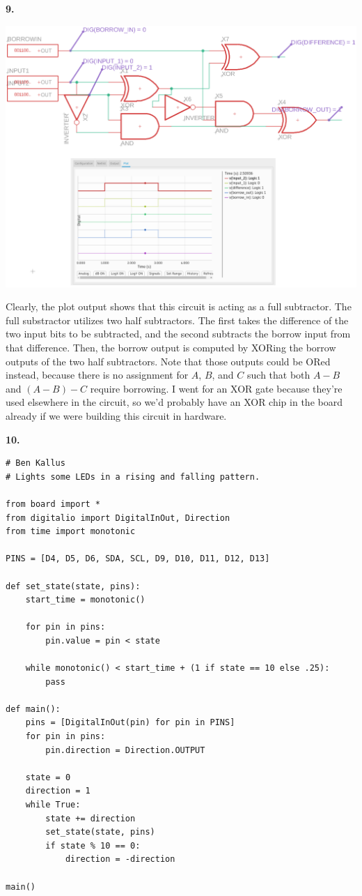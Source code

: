 \documentclass{article}
\begin{document}
\newpage\noindent\textbf{9.}
\begin{center}
    \includegraphics[scale=.4]{4.png}
\end{center}

    Clearly, the plot output shows that this circuit is acting as a full subtractor.
    The full substractor utilizes two half subtractors.
    The first takes the difference of the two input bits to be subtracted, and the second subtracts the borrow input from that difference.
    Then, the borrow output is computed by XORing the borrow outputs of the two half subtractors.
    Note that those outputs could be ORed instead, because there is no assignment for $A$, $B$, and $C$ such that both $A - B$ and $(A - B) - C$ require borrowing.
    I went for an XOR gate because they're used elsewhere in the circuit, so we'd probably have an XOR chip in the board already if we were building this circuit in hardware.

\newpage\noindent\textbf{10.}
\begin{verbatim}# Ben Kallus
# Lights some LEDs in a rising and falling pattern.

from board import *
from digitalio import DigitalInOut, Direction
from time import monotonic

PINS = [D4, D5, D6, SDA, SCL, D9, D10, D11, D12, D13]

def set_state(state, pins):
    start_time = monotonic()

    for pin in pins:
        pin.value = pin < state

    while monotonic() < start_time + (1 if state == 10 else .25):
        pass

def main():
    pins = [DigitalInOut(pin) for pin in PINS]
    for pin in pins:
        pin.direction = Direction.OUTPUT

    state = 0
    direction = 1
    while True:
        state += direction
        set_state(state, pins)
        if state % 10 == 0:
            direction = -direction

main()

\end{verbatim}
\end{document}
